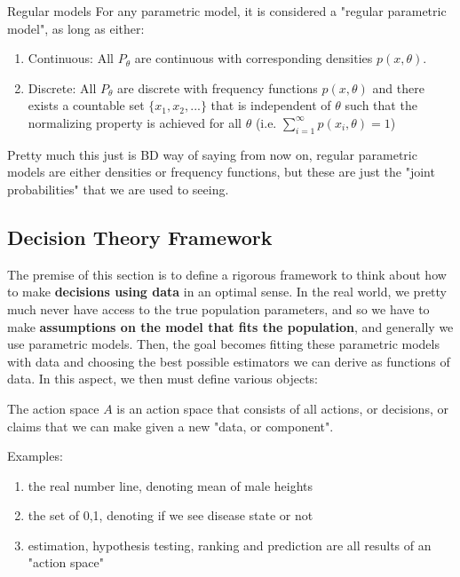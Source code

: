     \begin{definition}{Regular models}
      For any parametric model, it is considered a "regular parametric model", as long as either:
      \begin{enumerate}
        \item Continuous: All $P_\theta$ are continuous with corresponding densities $p(x, \theta)$.
        \item Discrete: All $P_\theta$ are discrete with frequency functions $p(x, \theta)$ and there exists a countable set $\{x_1, x_2, ...\}$ that is independent of $\theta$ such that the normalizing property is achieved for all $\theta$ (i.e. $\sum_{i=1}^\infty p(x_i, \theta) = 1$)
      \end{enumerate}
      Pretty much this just is BD way of saying from now on, regular parametric models are either densities or frequency functions, but these are just the "joint probabilities" that we are used to seeing.
    \end{definition}

  \subsection{Decision Theory Framework}

    The premise of this section is to define a rigorous framework to think about how to make \textbf{decisions using data} in an optimal sense. In the real world, we pretty much never have access to the true population parameters, and so we have to make \textbf{assumptions on the model that fits the population}, and generally we use parametric models. Then, the goal becomes fitting these parametric models with data and choosing the best possible estimators we can derive as functions of data. In this aspect, we then must define various objects:

    \begin{definition}{The action space}
    $A$ is an action space that consists of all actions, or decisions, or claims that we can make given a new "data, or component".

    Examples: 
    \begin{enumerate}
      \item the real number line, denoting mean of male heights
      \item the set of {0,1}, denoting if we see disease state or not
      \item estimation, hypothesis testing, ranking and prediction are all results of an "action space"
    \end{enumerate}
    \end{definition}

